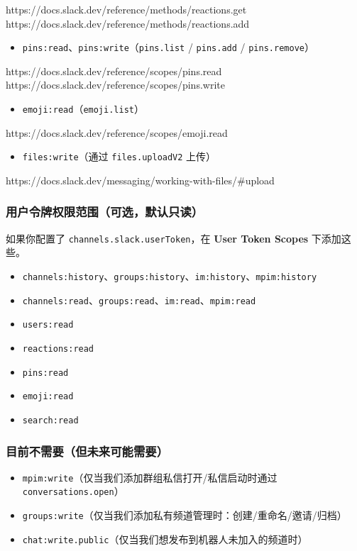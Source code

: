 https://docs.slack.dev/reference/methods/reactions.get
https://docs.slack.dev/reference/methods/reactions.add
\begin{itemize}
  \item \texttt{pins:read}、\texttt{pins:write}（\texttt{pins.list} / \texttt{pins.add} / \texttt{pins.remove}）
\end{itemize}

https://docs.slack.dev/reference/scopes/pins.read
https://docs.slack.dev/reference/scopes/pins.write
\begin{itemize}
  \item \texttt{emoji:read}（\texttt{emoji.list}）
\end{itemize}

https://docs.slack.dev/reference/scopes/emoji.read
\begin{itemize}
  \item \texttt{files:write}（通过 \texttt{files.uploadV2} 上传）
\end{itemize}

https://docs.slack.dev/messaging/working-with-files/\#upload

\subsubsection{用户令牌权限范围（可选，默认只读）}


如果你配置了 \texttt{channels.slack.userToken}，在 \textbf{User Token Scopes} 下添加这些。

\begin{itemize}
  \item \texttt{channels:history}、\texttt{groups:history}、\texttt{im:history}、\texttt{mpim:history}
  \item \texttt{channels:read}、\texttt{groups:read}、\texttt{im:read}、\texttt{mpim:read}
  \item \texttt{users:read}
  \item \texttt{reactions:read}
  \item \texttt{pins:read}
  \item \texttt{emoji:read}
  \item \texttt{search:read}
\end{itemize}


\subsubsection{目前不需要（但未来可能需要）}


\begin{itemize}
  \item \texttt{mpim:write}（仅当我们添加群组私信打开/私信启动时通过 \texttt{conversations.open}）
  \item \texttt{groups:write}（仅当我们添加私有频道管理时：创建/重命名/邀请/归档）
  \item \texttt{chat:write.public}（仅当我们想发布到机器人未加入的频道时）
\end{itemize}

